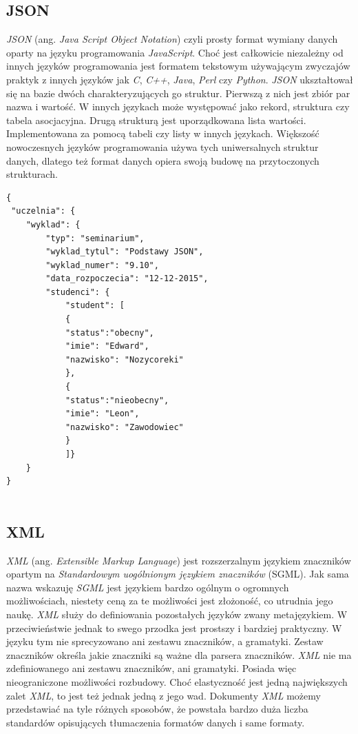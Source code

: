 \documentclass{iiuwb}
\begin{document}
\subsection{JSON}
\textit{JSON} (ang. \textit{Java Script Object Notation}) \cite{Bray:05:JSON} czyli prosty format wymiany danych oparty na języku programowania \textit{JavaScript}. Choć jest całkowicie niezależny od innych języków programowania jest formatem tekstowym używającym zwyczajów praktyk z innych języków jak \textit{C}, \textit{C++}, \textit{Java}, \textit{Perl} czy \textit{Python}. \textit{JSON} ukształtował się na bazie dwóch charakteryzujących go struktur. Pierwszą z nich jest zbiór par nazwa i wartość. W innych językach może występować jako rekord, struktura czy tabela asocjacyjna. Drugą strukturą jest uporządkowana lista wartości. Implementowana za pomocą tabeli czy listy w innych językach.
Większość nowoczesnych języków programowania używa tych uniwersalnych struktur danych, dlatego też format danych opiera swoją budowę na przytoczonych strukturach. 

\begin{lstlisting}[label=Struktura danych JSON, caption=Przykładowa struktura danych w formacie JSON]
{
 "uczelnia": {
 	"wyklad": {
 		"typ": "seminarium",
 		"wyklad_tytul": "Podstawy JSON",
 		"wyklad_numer": "9.10",
 		"data_rozpoczecia": "12-12-2015",
 		"studenci": {
 			"student": [
 			{
 			"status":"obecny",
 			"imie": "Edward",
 			"nazwisko": "Nozycoreki"
 			},
 			{
 			"status":"nieobecny",
 			"imie": "Leon",
 			"nazwisko": "Zawodowiec"
 			}
 			]}
 	}
}
 			
\end{lstlisting}
\subsection{XML}
\textit{XML} (ang. \textit{Extensible Markup Language}) \cite{Bray:11:XML} jest rozszerzalnym językiem znaczników opartym na \textit{Standardowym uogólnionym językiem znaczników} (SGML). Jak sama nazwa wskazuję \textit{SGML} jest językiem bardzo ogólnym o ogromnych możliwościach, niestety ceną za te możliwości jest złożoność, co utrudnia jego naukę. \textit{XML} służy do definiowania pozostałych języków zwany metajęzykiem. W przeciwieństwie jednak to swego przodka jest prostszy i bardziej praktyczny. W języku tym nie sprecyzowano ani zestawu znaczników, a gramatyki. Zestaw znaczników określa jakie znaczniki są ważne dla parsera znaczników. \textit{XML} nie ma zdefiniowanego ani zestawu znaczników, ani gramatyki. Posiada więc nieograniczone możliwości rozbudowy. Choć elastyczność jest jedną największych zalet \textit{XML}, to jest też jednak jedną z jego wad. Dokumenty \textit{XML} możemy przedstawiać na tyle różnych sposobów, że powstała bardzo duża liczba standardów opisujących tłumaczenia formatów danych i same formaty.
\end{document}
